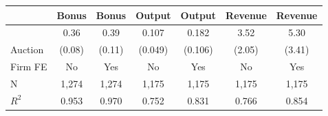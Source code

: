 
\begin{tabular}{lcccccc}
\toprule
 & Bonus & Bonus & Output & Output & Revenue & Revenue\\
\midrule
 & 0.36 & 0.39 & 0.107 & 0.182 & 3.52 & 5.30\\

\multirow{-2}{*}{\raggedright\arraybackslash Auction} & (0.08) & (0.11) & (0.049) & (0.106) & (2.05) & (3.41)\\

\midrule
Firm FE & No & Yes & No & Yes & No & Yes\\

N & 1,274 & 1,274 & 1,175 & 1,175 & 1,175 & 1,175\\

$R^2$ & 0.953 & 0.970 & 0.752 & 0.831 & 0.766 & 0.854\\
\bottomrule
\end{tabular}
